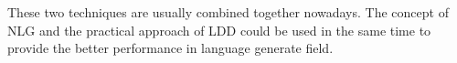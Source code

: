 These two techniques are usually combined together nowadays. 
The concept of NLG and the practical approach of LDD could be used in the same time to provide the better performance in language generate field.

\newpage %


\newpage %